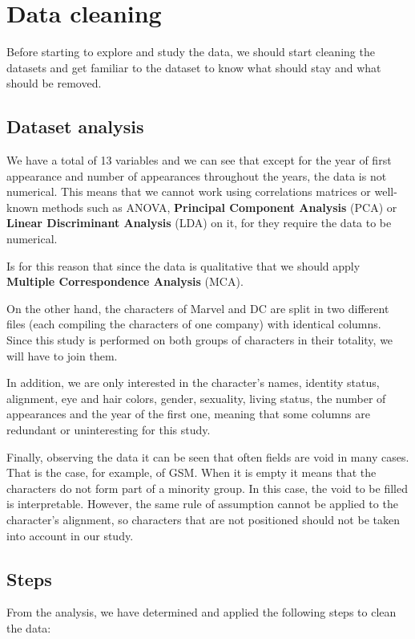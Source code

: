 \newpage
\section{Data cleaning}

Before starting to explore and study the data, we should start cleaning the datasets and get familiar to the dataset to know what should stay and what should be removed.

\subsection{Dataset analysis}

We have a total of 13 variables and we can see that except for the year of first appearance and number of appearances throughout the years, the data is not numerical. This means that we cannot work using correlations matrices or well-known methods such as ANOVA, \textbf{Principal Component Analysis}  (PCA) or \textbf{Linear Discriminant Analysis} (LDA) on it, for they require the data to be numerical.

Is for this reason that since the data is qualitative that we should apply \textbf{Multiple Correspondence Analysis} (MCA).

On the other hand, the characters of Marvel and DC are split in two different files (each compiling the characters of one company) with identical columns. Since this study is performed on both groups of characters in their totality, we will have to join them.

In addition, we are only interested in the character's names, identity status, alignment, eye and hair colors, gender, sexuality, living status, the number of appearances and the year of the first one, meaning that some columns are redundant or uninteresting for this study.
 
 Finally, observing the data it can be seen that often fields are void in many cases. That is the case, for example, of GSM. When it is empty it means that the characters do not form part of a minority group. In this case, the void to be filled is interpretable. However, the same rule of assumption cannot be applied to the character's alignment, so characters that are not positioned should not be taken into account in our study.
  

\subsection{Steps}
From the analysis, we have determined and applied the following steps to clean the data:

